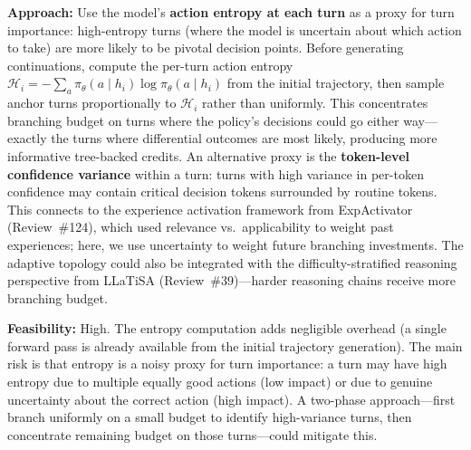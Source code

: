 \documentclass[11pt,a4paper]{article}
\begin{document}
\textbf{Approach:} Use the model's \textbf{action entropy at each turn} as a proxy for turn importance: high-entropy turns (where the model is uncertain about which action to take) are more likely to be pivotal decision points. Before generating continuations, compute the per-turn action entropy $\mathcal{H}_i = -\sum_a \pi_{\theta}(a \mid h_i) \log \pi_{\theta}(a \mid h_i)$ from the initial trajectory, then sample anchor turns proportionally to $\mathcal{H}_i$ rather than uniformly. This concentrates branching budget on turns where the policy's decisions could go either way---exactly the turns where differential outcomes are most likely, producing more informative tree-backed credits. An alternative proxy is the \textbf{token-level confidence variance} within a turn: turns with high variance in per-token confidence may contain critical decision tokens surrounded by routine tokens. This connects to the experience activation framework from ExpActivator (Review~\#124), which used relevance vs.\ applicability to weight past experiences; here, we use uncertainty to weight future branching investments. The adaptive topology could also be integrated with the difficulty-stratified reasoning perspective from LLaTiSA (Review~\#39)---harder reasoning chains receive more branching budget.

\textbf{Feasibility:} High. The entropy computation adds negligible overhead (a single forward pass is already available from the initial trajectory generation). The main risk is that entropy is a noisy proxy for turn importance: a turn may have high entropy due to multiple equally good actions (low impact) or due to genuine uncertainty about the correct action (high impact). A two-phase approach---first branch uniformly on a small budget to identify high-variance turns, then concentrate remaining budget on those turns---could mitigate this.
\end{document}
